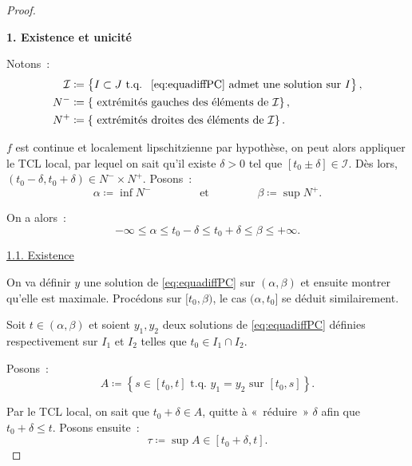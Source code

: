 \documentclass{report}
\theoremstyle{definition}
\theoremstyle{remark}
\numberwithin{equation}{section}
\newcommand{\tq}{\text{ t.q. }}
\newcommand{\minfty}{{-\infty}}
\newcommand{\pinfty}{{+\infty}}
\begin{document}
			\begin{proof}~

			\textbf{1. Existence et unicité}

				Notons~:
				\begin{align}
					\mathcal I &\coloneqq \left\{I \subset J \tq \text{ \eqref{eq:equadiffPC} admet une solution sur } I\right\}, \\
					N^- &\coloneqq \left\{\text{ extrémités gauches des éléments de } \mathcal I\right\}, \\
					N^+ &\coloneqq \left\{\text{ extrémités droites des éléments de } \mathcal I\right\}.
				\end{align}

				$f$ est continue et localement lipschitzienne par hypothèse, on peut alors appliquer le TCL local, par lequel on sait qu'il existe $\delta > 0$
				tel que $[t_0 \pm \delta] \in \mathcal I$. Dès lors, $(t_0-\delta, t_0+\delta) \in N^- \times N^+$. Posons~:
				\begin{equation}
					\alpha \coloneqq \inf N^- \qquad\qquad \text{ et } \qquad\qquad \beta \coloneqq \sup N^+.
				\end{equation}

				On a alors~:
				\begin{equation}
					\minfty \leq \alpha \leq t_0-\delta \leq t_0+\delta \leq \beta \leq \pinfty.
				\end{equation}

				\underline{1.1. Existence}

					On va définir $y$ une solution de \eqref{eq:equadiffPC} sur $(\alpha, \beta)$ et ensuite montrer qu'elle est maximale. Procédons sur
					$[t_0, \beta)$, le cas $(\alpha, t_0]$ se déduit similairement.

					Soit $t \in (\alpha, \beta)$ et soient $y_1, y_2$ deux solutions de \eqref{eq:equadiffPC} définies respectivement sur $I_1$ et $I_2$ telles
					que $t_0 \in I_1 \cap I_2$.

					Posons~:
					\begin{equation}
						A \coloneqq \left\{s \in [t_0, t] \tq y_1 = y_2 \text { sur } [t_0, s]\right\}.
					\end{equation}

					Par le TCL local, on sait que $t_0 + \delta \in A$, quitte à «~réduire~» $\delta$ afin que $t_0+\delta \leq t$. Posons ensuite~:
					\begin{equation}
						\tau \coloneqq \sup A \in [t_0+\delta, t].
					\end{equation}


\end{proof}
\end{document}
